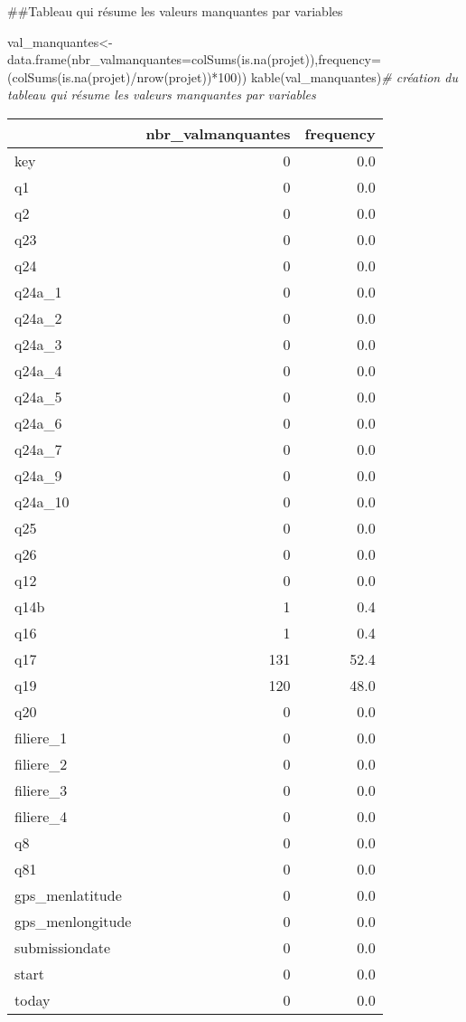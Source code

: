\documentclass[
]{article}
\newenvironment{Shaded}{\begin{snugshade}}{\end{snugshade}}
\newcommand{\AttributeTok}[1]{\textcolor[rgb]{0.77,0.63,0.00}{#1}}
\newcommand{\CommentTok}[1]{\textcolor[rgb]{0.56,0.35,0.01}{\textit{#1}}}
\newcommand{\DecValTok}[1]{\textcolor[rgb]{0.00,0.00,0.81}{#1}}
\newcommand{\FunctionTok}[1]{\textcolor[rgb]{0.00,0.00,0.00}{#1}}
\newcommand{\NormalTok}[1]{#1}
\newcommand{\OtherTok}[1]{\textcolor[rgb]{0.56,0.35,0.01}{#1}}
\newcommand{\SpecialCharTok}[1]{\textcolor[rgb]{0.00,0.00,0.00}{#1}}
\begin{document}
\#\#Tableau qui résume les valeurs manquantes par variables

\begin{Shaded}
\begin{Highlighting}[]
\NormalTok{val\_manquantes}\OtherTok{\textless{}{-}}\FunctionTok{data.frame}\NormalTok{(}\AttributeTok{nbr\_valmanquantes=}\FunctionTok{colSums}\NormalTok{(}\FunctionTok{is.na}\NormalTok{(projet)),}\AttributeTok{frequency=}\NormalTok{(}\FunctionTok{colSums}\NormalTok{(}\FunctionTok{is.na}\NormalTok{(projet)}\SpecialCharTok{/}\FunctionTok{nrow}\NormalTok{(projet))}\SpecialCharTok{*}\DecValTok{100}\NormalTok{))}
\FunctionTok{kable}\NormalTok{(val\_manquantes)}\CommentTok{\# création du tableau qui résume les valeurs manquantes par variables}
\end{Highlighting}
\end{Shaded}

\begin{longtable}[]{@{}lrr@{}}
\toprule()
& nbr\_valmanquantes & frequency \\
\midrule()
\endhead
key & 0 & 0.0 \\
q1 & 0 & 0.0 \\
q2 & 0 & 0.0 \\
q23 & 0 & 0.0 \\
q24 & 0 & 0.0 \\
q24a\_1 & 0 & 0.0 \\
q24a\_2 & 0 & 0.0 \\
q24a\_3 & 0 & 0.0 \\
q24a\_4 & 0 & 0.0 \\
q24a\_5 & 0 & 0.0 \\
q24a\_6 & 0 & 0.0 \\
q24a\_7 & 0 & 0.0 \\
q24a\_9 & 0 & 0.0 \\
q24a\_10 & 0 & 0.0 \\
q25 & 0 & 0.0 \\
q26 & 0 & 0.0 \\
q12 & 0 & 0.0 \\
q14b & 1 & 0.4 \\
q16 & 1 & 0.4 \\
q17 & 131 & 52.4 \\
q19 & 120 & 48.0 \\
q20 & 0 & 0.0 \\
filiere\_1 & 0 & 0.0 \\
filiere\_2 & 0 & 0.0 \\
filiere\_3 & 0 & 0.0 \\
filiere\_4 & 0 & 0.0 \\
q8 & 0 & 0.0 \\
q81 & 0 & 0.0 \\
gps\_menlatitude & 0 & 0.0 \\
gps\_menlongitude & 0 & 0.0 \\
submissiondate & 0 & 0.0 \\
start & 0 & 0.0 \\
today & 0 & 0.0 \\
\bottomrule()
\end{longtable}
\end{document}
